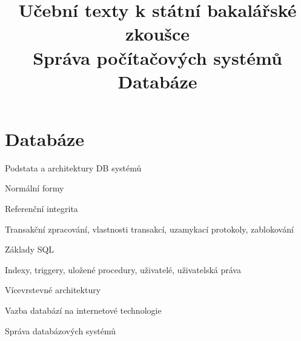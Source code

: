 \clearpage  \clearpage
\title{\LARGE Učební texty k státní bakalářské zkoušce \\ Správa počítačových systémů \\ Databáze}

\maketitle
\newpage
\setcounter{section}{2}
\section{Databáze}
\begin{pozadavky}
\begin{pitemize}
\item Podstata a architektury DB systémů
\item Normální formy
\item Referenční integrita
\item Transakční zpracování, vlastnosti transakcí, uzamykací protokoly, zablokování
\item Základy SQL
\item Indexy, triggery, uložené procedury, uživatelé, uživatelská práva
\item Vícevrstevné architektury
\item Vazba databází na internetové technologie
\item Správa databázových systémů
\end{pitemize}
\end{pozadavky}












